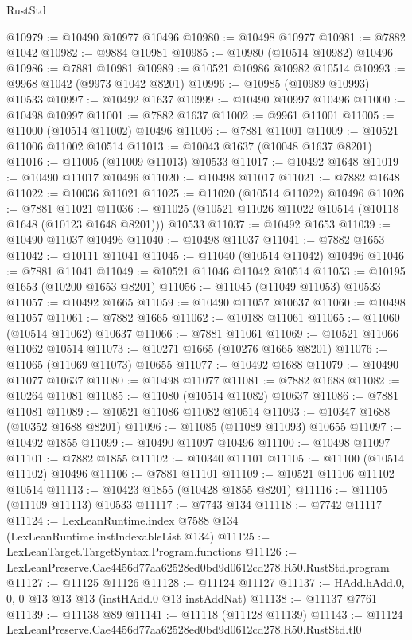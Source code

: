 \begin{lexlean}{RustStd}
\begin{coremodule}
@10979 := @10490 @10977 @10496
@10980 := @10498 @10977
@10981 := @7882 @1042
@10982 := @9884 @10981
@10985 := @10980 (@10514 @10982) @10496
@10986 := @7881 @10981
@10989 := @10521 @10986 @10982 @10514
@10993 := @9968 @1042 (@9973 @1042 @8201)
@10996 := @10985 (@10989 @10993) @10533
@10997 := @10492 @1637
@10999 := @10490 @10997 @10496
@11000 := @10498 @10997
@11001 := @7882 @1637
@11002 := @9961 @11001
@11005 := @11000 (@10514 @11002) @10496
@11006 := @7881 @11001
@11009 := @10521 @11006 @11002 @10514
@11013 := @10043 @1637 (@10048 @1637 @8201)
@11016 := @11005 (@11009 @11013) @10533
@11017 := @10492 @1648
@11019 := @10490 @11017 @10496
@11020 := @10498 @11017
@11021 := @7882 @1648
@11022 := @10036 @11021
@11025 := @11020 (@10514 @11022) @10496
@11026 := @7881 @11021
@11036 := @11025 (@10521 @11026 @11022 @10514 (@10118 @1648 (@10123 @1648 @8201))) @10533
@11037 := @10492 @1653
@11039 := @10490 @11037 @10496
@11040 := @10498 @11037
@11041 := @7882 @1653
@11042 := @10111 @11041
@11045 := @11040 (@10514 @11042) @10496
@11046 := @7881 @11041
@11049 := @10521 @11046 @11042 @10514
@11053 := @10195 @1653 (@10200 @1653 @8201)
@11056 := @11045 (@11049 @11053) @10533
@11057 := @10492 @1665
@11059 := @10490 @11057 @10637
@11060 := @10498 @11057
@11061 := @7882 @1665
@11062 := @10188 @11061
@11065 := @11060 (@10514 @11062) @10637
@11066 := @7881 @11061
@11069 := @10521 @11066 @11062 @10514
@11073 := @10271 @1665 (@10276 @1665 @8201)
@11076 := @11065 (@11069 @11073) @10655
@11077 := @10492 @1688
@11079 := @10490 @11077 @10637
@11080 := @10498 @11077
@11081 := @7882 @1688
@11082 := @10264 @11081
@11085 := @11080 (@10514 @11082) @10637
@11086 := @7881 @11081
@11089 := @10521 @11086 @11082 @10514
@11093 := @10347 @1688 (@10352 @1688 @8201)
@11096 := @11085 (@11089 @11093) @10655
@11097 := @10492 @1855
@11099 := @10490 @11097 @10496
@11100 := @10498 @11097
@11101 := @7882 @1855
@11102 := @10340 @11101
@11105 := @11100 (@10514 @11102) @10496
@11106 := @7881 @11101
@11109 := @10521 @11106 @11102 @10514
@11113 := @10423 @1855 (@10428 @1855 @8201)
@11116 := @11105 (@11109 @11113) @10533
@11117 := @7743 @134
@11118 := @7742 @11117
@11124 := LexLeanRuntime.index @7588 @134 (LexLeanRuntime.instIndexableList @134)
@11125 := LexLeanTarget.TargetSyntax.Program.functions
@11126 := LexLeanPreserve.Cae4456d77aa62528ed0bd9d0612cd278.R50.RustStd.program
@11127 := @11125 @11126
@11128 := @11124 @11127
@11137 := HAdd.hAdd.{0, 0, 0} @13 @13 @13 (instHAdd.{0} @13 instAddNat)
@11138 := @11137 @7761
@11139 := @11138 @89
@11141 := @11118 (@11128 @11139)
@11143 := @11124 LexLeanPreserve.Cae4456d77aa62528ed0bd9d0612cd278.R50.RustStd.tl0

\end{coremodule}
\end{lexlean}
